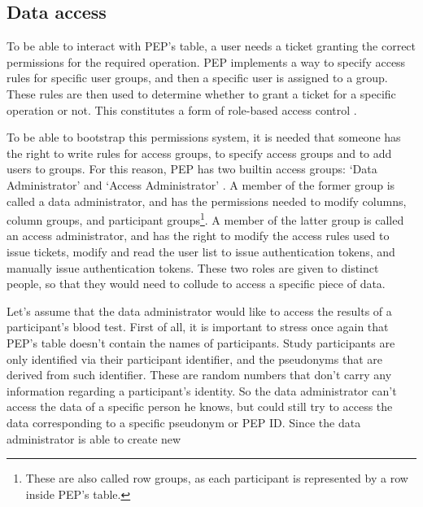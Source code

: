 \documentclass{report}
\begin{document}
\subsection{Data access} \label{data_access}
To be able to interact with PEP's table, a user needs a ticket granting the correct permissions for the required operation. PEP implements a way to specify access rules for
specific user groups, and then a specific user is assigned to a group. These rules are then used to determine whether to grant a ticket for a specific operation or not. This
constitutes a form of role-based access control \cite{rbac}. \par
To be able to bootstrap this permissions system, it is needed that someone has the right to write rules for access groups, to specify access groups and to add users to groups. For 
this reason, PEP has two builtin access groups: \enquote*{Data Administrator} and \enquote*{Access Administrator} \cite{pep-blueprint}. A member of the former group is called a data administrator, and 
has the permissions needed to modify columns, column groups, and participant groups\footnote{These are also called row groups, as each participant is represented by a row inside
PEP's table.}. A member of the latter group is called an access administrator, and has the right to modify the 
access rules used to issue tickets, modify and read the user list to issue authentication tokens, and manually issue authentication tokens. These two roles are given to distinct people, 
so that they would need to collude to access a specific piece of data. \par
Let's assume that the data administrator would like to access the results of a participant's blood test. First of 
all, it is important to stress once again that PEP's table doesn't contain the names of participants. Study participants are only identified via their participant identifier, and the 
pseudonyms that are derived from such identifier. These are random numbers that don't carry any information regarding a participant's identity. So the data administrator can't access 
the data of a specific person he knows, but could still try to access the data corresponding to a specific pseudonym or PEP ID. Since the data administrator is able to create new
\end{document}
